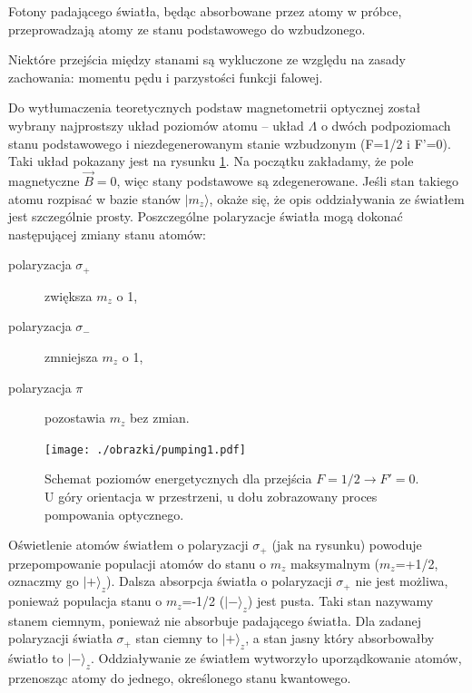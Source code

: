 \documentclass[a4paper,10pt]{article}
\begin{document}
Fotony padającego światła, będąc absorbowane przez atomy w próbce, przeprowadzają atomy ze stanu podstawowego do wzbudzonego.

Niektóre przejścia między stanami są wykluczone ze względu na zasady zachowania: momentu pędu i parzystości funkcji falowej. 

Do wytłumaczenia teoretycznych podstaw magnetometrii optycznej został wybrany najprostszy układ poziomów atomu -- układ $\Lambda$ o dwóch podpoziomach stanu podstawowego i niezdegenerowanym stanie wzbudzonym (F=1/2 i F'=0).
Taki układ pokazany jest na rysunku \ref{poziomyL}. Na początku zakładamy, że pole magnetyczne $\vec B=0$, więc stany podstawowe są zdegenerowane.
Jeśli stan takiego atomu rozpisać w bazie stanów $\lvert m_z \rangle$, okaże się, że opis oddziaływania ze światłem jest szczególnie prosty. Poszczególne polaryzacje światła mogą dokonać następującej zmiany stanu atomów:
\begin{center}
\begin{description}
\item[polaryzacja $\sigma_+$] zwiększa $m_z$ o 1,
\item[polaryzacja $\sigma_-$] zmniejsza $m_z$ o 1,
\item[polaryzacja $\pi$] pozostawia $m_z$ bez zmian.
\end{description}
\end{center}


\begin{figure}[h!]
\begin{center}
 \texttt{[image: ./obrazki/pumping1.pdf]}
\end{center}
\caption{ Schemat poziomów energetycznych dla przejścia $F=1/2 \rightarrow F'=0$. U góry orientacja w przestrzeni, u dołu zobrazowany proces pompowania optycznego.}
\label{poziomyL}
\end{figure}

Oświetlenie atomów światłem o polaryzacji $\sigma_+$ (jak na rysunku) powoduje przepompowanie populacji atomów do stanu o $m_z$ maksymalnym ($m_z$=+1/2, oznaczmy go $\lvert + \rangle_z$). Dalsza absorpcja światła o polaryzacji $\sigma_+$ nie jest możliwa, ponieważ populacja stanu o $m_z$=-1/2 ($\lvert - \rangle_z$) jest pusta. Taki stan nazywamy stanem ciemnym, ponieważ nie absorbuje padającego światła. Dla zadanej polaryzacji  światła $\sigma_+$ stan ciemny to $\lvert + \rangle_z$, a stan jasny który absorbowałby światło to $\lvert - \rangle_z$. Oddziaływanie ze światłem wytworzyło uporządkowanie atomów, przenosząc atomy do jednego, określonego stanu kwantowego.
 
\end{document}
